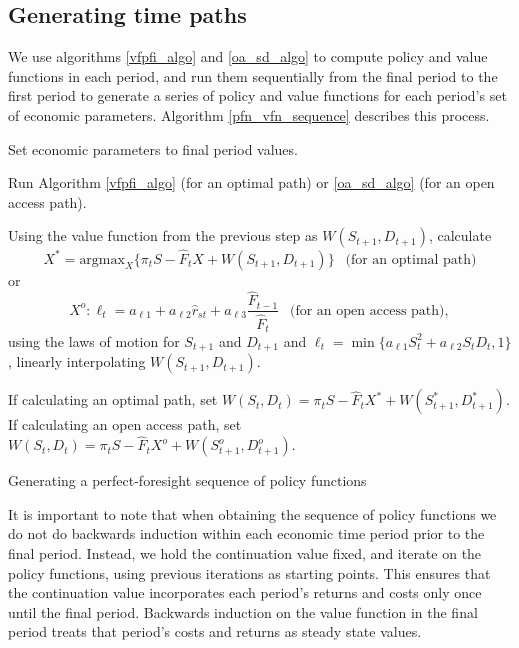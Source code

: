\documentclass[12pt]{article}
\begin{document}
\subsection{Generating time paths}

We use algorithms \ref{vfpfi_algo} and \ref{oa_sd_algo} to compute policy and value functions in each period, and run them sequentially from the final period to the first period to generate a series of policy and value functions for each period's set of economic parameters. Algorithm \ref{pfn_vfn_sequence} describes this process. \\

\begin{algorithm}[H]
	Set economic parameters to final period values.
	
	Run Algorithm \ref{vfpfi_algo} (for an optimal path) or \ref{oa_sd_algo} (for an open access path).
	
	 {
		Using the value function from the previous step as $W(S_{t+1},D_{t+1})$, calculate
		\[ X^* = \text{argmax}_X \{ \pi_t S - \hat{F}_t X + W(S_{t+1},D_{t+1}) \} ~~ \text{ (for an optimal path)}\]
		or
		\[ X^o : \ell_t =  a_{\ell 1} + a_{\ell 2} \hat{r}_{st} + a_{\ell 3} \frac{\hat{F}_{t-1}}{\hat{F}_t} ~~ \text{ (for an open access path)},\]
		using the laws of motion for $S_{t+1}$ and $D_{t+1}$ and $\ell_t = \min\{ a_{\ell 1} S_t^2 + a_{\ell 2} S_t D_t, 1\}$, linearly interpolating $W(S_{t+1},D_{t+1})$.
		
		If calculating an optimal path, set $W(S_t,D_t) = \pi_t S - \hat{F}_t X^* + W(S^*_{t+1},D^*_{t+1})$. If calculating an open access path, set $W(S_t,D_t) = \pi_t S - \hat{F}_t X^o + W(S^o_{t+1},D^o_{t+1})$.
	}
	\caption{Generating a perfect-foresight sequence of policy functions}\label{pfn_vfn_sequence}
\end{algorithm}

It is important to note that when obtaining the sequence of policy functions we do not do backwards induction within each economic time period prior to the final period. Instead, we hold the continuation value fixed, and iterate on the policy functions, using previous iterations as starting points. This ensures that the continuation value incorporates each period's returns and costs only once until the final period. Backwards induction on the value function in the final period treats that period's costs and returns as steady state values. \\
\end{document}
